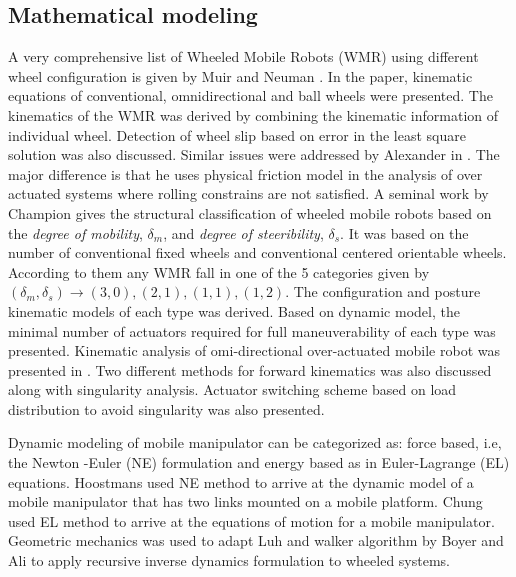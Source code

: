 \subsection{Mathematical modeling}
A very comprehensive list of Wheeled Mobile Robots (WMR) using different wheel configuration is given by Muir and Neuman \cite{muir1987kinematic}. In the paper, kinematic equations of conventional, omnidirectional and ball wheels were presented. The kinematics of the WMR was derived by combining the kinematic information of   individual wheel. Detection of wheel slip based on  error in the least square solution was also discussed. Similar issues were addressed by Alexander in \cite{alexander1989kinematics}. The major difference is that he uses physical friction model in the analysis of over actuated systems where rolling constrains are not satisfied. A seminal work by Champion \cite{campion1996structural} gives the structural classification of wheeled mobile robots based on the \textit{degree of mobility}, $\delta_m$, and \textit{degree of steeribility}, $\delta_s$. It was based on the number of conventional fixed wheels and  conventional centered orientable wheels. According to them any WMR fall in one of the 5 categories given by $(\delta_m,\delta_s)\rightarrow(3,0),(2,1),(1,1),(1,2)$. 
The configuration and posture kinematic models of each type was derived. Based on  dynamic model, the minimal number of actuators required for full maneuverability of each type was presented. Kinematic analysis of omi-directional over-actuated mobile robot  was presented in \cite{yi2002kinematics}. Two different methods for forward kinematics was also discussed along with  singularity analysis. Actuator switching scheme based on load distribution to avoid singularity was also presented. 

Dynamic modeling of mobile manipulator can be categorized as: force based, i.e, the Newton -Euler (NE) formulation and  energy based as in Euler-Lagrange (EL) equations. Hoostmans \cite{hootsmans1992motion} used NE method to arrive at  the dynamic model of a mobile manipulator that has two links mounted on a mobile platform. Chung \cite{chung1998interaction} used EL method to arrive at the equations of motion for a mobile manipulator. Geometric mechanics was used to adapt Luh and walker \cite{luh1980line} algorithm  by Boyer and Ali \cite{boyer2011recursive} to apply recursive inverse dynamics formulation to wheeled systems.   

